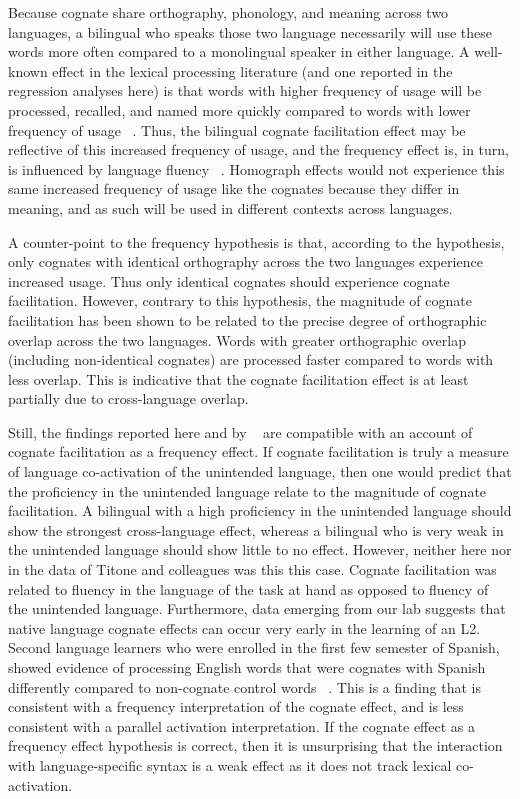 Because cognate share orthography, phonology, and meaning across two languages, a bilingual who speaks those two language necessarily will use these words more often compared to a monolingual speaker in either language. A well-known effect in the lexical processing literature (and one reported in the regression analyses here) is that words with higher frequency of usage will be processed, recalled, and named more quickly compared to words with lower frequency of usage ~\citep{Forster1973}. Thus, the bilingual cognate facilitation effect may be reflective of this increased frequency of usage, and the frequency effect is, in turn, is influenced by language fluency ~\citep{Gollan2008}. Homograph effects would not experience this same increased frequency of usage like the cognates because they differ in meaning, and as such will be used in different contexts across languages.

A counter-point to the frequency hypothesis is that, according to the hypothesis, only cognates with identical orthography across the two languages experience increased usage. Thus only identical cognates should experience cognate facilitation. However, contrary to this hypothesis, the magnitude of cognate facilitation has been shown to be related to the precise degree of orthographic overlap across the two languages. Words with greater orthographic overlap (including non-identical cognates) are processed faster compared to words with less overlap. This is indicative that the cognate facilitation effect is at least partially due to cross-language overlap. 

Still, the findings reported here and by ~\citep{Titone2011} are compatible with an account of cognate facilitation as a frequency effect. If cognate facilitation is truly a measure of language co-activation of the unintended language, then one would predict that the proficiency in the unintended language relate to the magnitude of cognate facilitation. A bilingual with a high proficiency in the unintended language should show the strongest cross-language effect, whereas a bilingual who is very weak in the unintended language should show little to no effect. However, neither here nor in the data of Titone and colleagues was this this case. Cognate facilitation was related to fluency in the language of the task at hand as opposed to fluency of the unintended language. Furthermore, data emerging from our lab suggests that native language cognate effects can occur very early in the learning of an L2. Second language learners who were enrolled in the first few semester of Spanish, showed evidence of processing English words that were cognates with Spanish differently compared to non-cognate control words ~\citep{Bice2013}. This is a finding that is consistent with a frequency interpretation of the cognate effect, and is less consistent with a parallel activation interpretation. If the cognate effect as a frequency effect hypothesis is correct, then it is unsurprising that the interaction with language-specific syntax is a weak effect as it does not track lexical co-activation.

